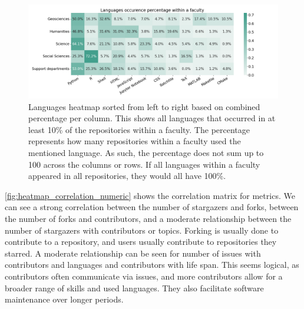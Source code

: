 \vspace{-0.2cm}
\begin{figure}[h!]
\centerline{
\includegraphics[scale=0.5]{figures_results/heatmap_languages_percentage.png}}
\caption{Languages heatmap sorted from left to right based on combined percentage per column. This shows all languages that occurred in at least 10\% of the repositories within a faculty. The percentage represents how many repositories within a faculty used the mentioned language. As such, the percentage does not sum up to 100 across the columns or rows. If all languages within a faculty appeared in all repositories, they would all have 100\%.
\label{fig:heatmap_languages_percentage}}
\end{figure}


\vspace{-0.3cm}
\autoref{fig:heatmap_correlation_numeric} shows the correlation matrix for metrics. We can see a strong correlation between the number of stargazers and forks, between the number of forks and contributors, and a moderate relationship between the number of stargazers with contributors or topics. Forking is usually done to contribute to a repository, and users usually contribute to repositories they starred. A moderate relationship can be seen for number of issues with contributors and languages and contributors with life span. This seems logical, as contributors often communicate via issues, and more contributors allow for a broader range of skills and used languages. They also facilitate software maintenance over longer periods.

